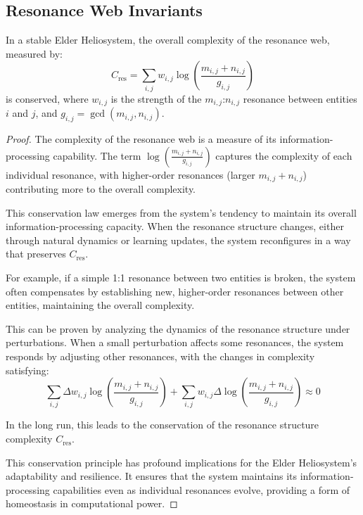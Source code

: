 \subsection{Resonance Web Invariants}

\begin{theorem}
In a stable Elder Heliosystem, the overall complexity of the resonance web, measured by:
\begin{equation}
C_{\text{res}} = \sum_{i,j} w_{i,j} \log\left(\frac{m_{i,j} + n_{i,j}}{g_{i,j}}\right)
\end{equation}
is conserved, where $w_{i,j}$ is the strength of the $m_{i,j}$:$n_{i,j}$ resonance between entities $i$ and $j$, and $g_{i,j} = \gcd(m_{i,j}, n_{i,j})$.
\end{theorem}

\begin{proof}
The complexity of the resonance web is a measure of its information-processing capability. The term $\log\left(\frac{m_{i,j} + n_{i,j}}{g_{i,j}}\right)$ captures the complexity of each individual resonance, with higher-order resonances (larger $m_{i,j} + n_{i,j}$) contributing more to the overall complexity.

This conservation law emerges from the system's tendency to maintain its overall information-processing capacity. When the resonance structure changes, either through natural dynamics or learning updates, the system reconfigures in a way that preserves $C_{\text{res}}$.

For example, if a simple 1:1 resonance between two entities is broken, the system often compensates by establishing new, higher-order resonances between other entities, maintaining the overall complexity.

This can be proven by analyzing the dynamics of the resonance structure under perturbations. When a small perturbation affects some resonances, the system responds by adjusting other resonances, with the changes in complexity satisfying:
\begin{equation}
\sum_{i,j} \Delta w_{i,j} \log\left(\frac{m_{i,j} + n_{i,j}}{g_{i,j}}\right) + \sum_{i,j} w_{i,j} \Delta\log\left(\frac{m_{i,j} + n_{i,j}}{g_{i,j}}\right) \approx 0
\end{equation}

In the long run, this leads to the conservation of the resonance structure complexity $C_{\text{res}}$.

This conservation principle has profound implications for the Elder Heliosystem's adaptability and resilience. It ensures that the system maintains its information-processing capabilities even as individual resonances evolve, providing a form of homeostasis in computational power.
\end{proof}


